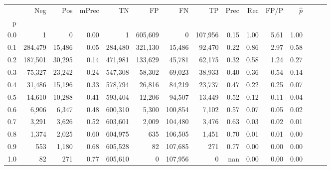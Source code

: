 \begin{tabular}{rrrrrrrrrrrrrrr}
\toprule
{} &      Neg &     Pos & mPrec &       TN &       FP &       FN &       TP &  Prec &   Rec &  FP/P & $\hat{p}$ \\
p   &          &         &       &          &          &          &          &       &       &       &           \\
\midrule
0.0 &        1 &       0 &  0.00 &        1 &  605,609 &        0 &  107,956 &  0.15 &  1.00 &  5.61 &      1.00 \\
0.1 &  284,479 &  15,486 &  0.05 &  284,480 &  321,130 &   15,486 &   92,470 &  0.22 &  0.86 &  2.97 &      0.58 \\
0.2 &  187,501 &  30,295 &  0.14 &  471,981 &  133,629 &   45,781 &   62,175 &  0.32 &  0.58 &  1.24 &      0.27 \\
0.3 &   75,327 &  23,242 &  0.24 &  547,308 &   58,302 &   69,023 &   38,933 &  0.40 &  0.36 &  0.54 &      0.14 \\
0.4 &   31,486 &  15,196 &  0.33 &  578,794 &   26,816 &   84,219 &   23,737 &  0.47 &  0.22 &  0.25 &      0.07 \\
0.5 &   14,610 &  10,288 &  0.41 &  593,404 &   12,206 &   94,507 &   13,449 &  0.52 &  0.12 &  0.11 &      0.04 \\
0.6 &    6,906 &   6,347 &  0.48 &  600,310 &    5,300 &  100,854 &    7,102 &  0.57 &  0.07 &  0.05 &      0.02 \\
0.7 &    3,291 &   3,626 &  0.52 &  603,601 &    2,009 &  104,480 &    3,476 &  0.63 &  0.03 &  0.02 &      0.01 \\
0.8 &    1,374 &   2,025 &  0.60 &  604,975 &      635 &  106,505 &    1,451 &  0.70 &  0.01 &  0.01 &      0.00 \\
0.9 &      553 &   1,180 &  0.68 &  605,528 &       82 &  107,685 &      271 &  0.77 &  0.00 &  0.00 &      0.00 \\
1.0 &       82 &     271 &  0.77 &  605,610 &        0 &  107,956 &        0 &   nan &  0.00 &  0.00 &      0.00 \\
\bottomrule
\end{tabular}

